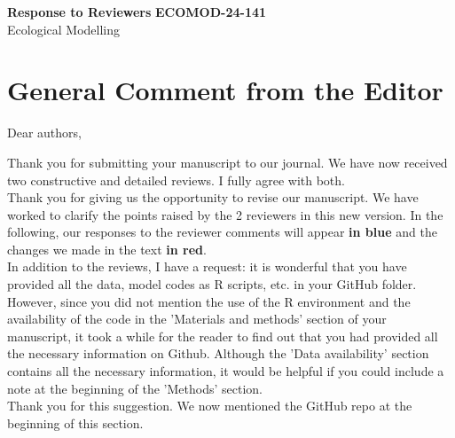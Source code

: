 \documentclass[a4paper, 11pt]{article}
\begin{document}
\noindent
\large\textbf{Response to Reviewers} \hfill \textbf{ECOMOD-24-141} \\
\normalsize Ecological Modelling \hfill \textit{} \\

\noindent\hrulefill
\tableofcontents
\noindent\hrulefill

\renewcommand*\thetable{R\arabic{table}}
\renewcommand*\thefigure{R\arabic{figure}}


\newcommand{\textappr}{\raisebox{0.5ex}{\texttildelow}}

\section{General Comment from the Editor}

Dear authors,

\noindent Thank you for submitting your manuscript to our journal. We have now received two constructive and detailed reviews. I fully agree with both. \\
\textcolor{customblue}{Thank you for giving us the opportunity to revise our manuscript. We have worked to clarify the points raised by the 2 reviewers in this new version. In the following, our responses to the reviewer comments will appear \textbf{in blue} and the changes we made in the text \textbf{\textcolor{customred}{in red}}.}\\


\noindent In addition to the reviews, I have a request: it is wonderful that you have provided all the data, model codes as R scripts, etc. in your GitHub folder. However, since you did not mention the use of the R environment and the availability of the code in the 'Materials and methods' section of your manuscript, it took a while for the reader to find out that you had provided all the necessary information on Github. Although the 'Data availability' section contains all the necessary information, it would be helpful if you could include a note at the beginning of the 'Methods' section.\\
\textcolor{customblue}{Thank you for this suggestion. We now mentioned the GitHub repo at the beginning of this section.}\\

\clearpage
\end{document}
